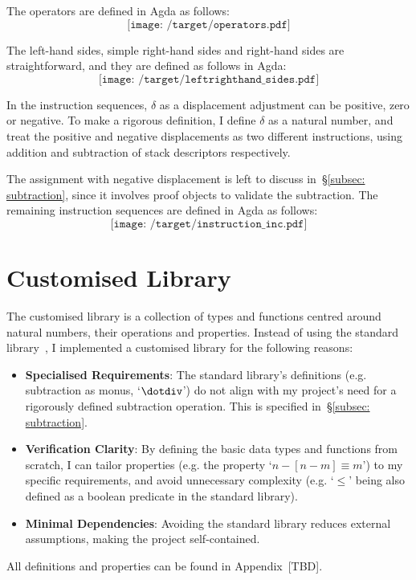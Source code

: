 \documentclass[12pt,a4paper]{report}
\theoremstyle{definition}
\newcommand{\secref}[1]{\S\ref{#1}}
\begin{document}
    The operators are defined in Agda as follows:
    \[\texttt{[image: /target/operators.pdf]}\]

    The left-hand sides, simple right-hand sides and right-hand sides are straightforward, and they are defined as follows in Agda:
    \[\texttt{[image: /target/leftrighthand\_sides.pdf]}\]

    In the instruction sequences, $\delta$ as a displacement adjustment can be positive, zero or negative. To make a rigorous definition, I define $\delta$ as a natural number, and treat the positive and negative displacements as two different instructions, using addition and subtraction of stack descriptors respectively. 

    The assignment with negative displacement is left to discuss in~\secref{subsec: subtraction}, since it involves proof objects to validate the subtraction. 
    The remaining instruction sequences are defined in Agda as follows:
    \[\texttt{[image: /target/instruction\_inc.pdf]}\]


    \section{Customised Library} \label{sec: lib}
    The customised library is a collection of types and functions centred around natural numbers, their operations and properties. Instead of using the standard library~\autocite{agda_std}, I implemented a customised library for the following reasons:
    \begin{itemize}
        \item
            \textbf{Specialised Requirements}: The standard library's definitions (e.g. subtraction as monus, `$\dotdiv$') do not align with my project's need for a rigorously defined subtraction operation. This is specified in~\secref{subsec: subtraction}.
        \item
            \textbf{Verification Clarity}: By defining the basic data types and functions from scratch, I can tailor properties (e.g. the property `$n-[n-m] \equiv m$') to my specific requirements, and avoid unnecessary complexity (e.g. `$\leq$' being also defined as a boolean predicate in the standard library). 
        \item
            \textbf{Minimal Dependencies}: Avoiding the standard library reduces external assumptions, making the project self-contained. 
    \end{itemize}
    All definitions and properties can be found in Appendix~[TBD].
\end{document}
